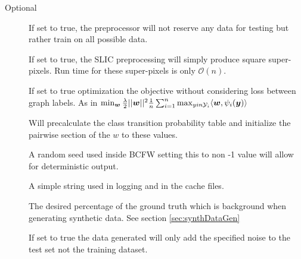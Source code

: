Optional
\begin{description}
\item[] If set to true, the preprocessor will not reserve any data for testing but rather train on all possible data. 
\item[] If set to true, the SLIC preprocessing will simply produce square super-pixels. Run time for these super-pixels is only $\mathcal{O}(n)$. 
\item[]If set to true optimization the objective without considering loss between graph labels. As in $\min_{\bm{w}} \frac{\lambda}{2} ||\bm{w}||^2 \frac{1}{n} \sum_{i=1}^n \max_{y in \mathcal{Y}_i} \langle \bm{w} , \psi_i(\bm{y}) \rangle$
\item[] Will precalculate the class transition probability table and initialize the pairwise section of the $w$ to these values. 
\item[] A random seed used inside BCFW setting this to non -1 value will allow for deterministic output. 
\item[] A simple string used in logging and in the cache files.
\item[] 
\item[] The desired percentage of the ground truth which is background when generating synthetic data. See section \ref{sec:synthDataGen}
\item[] If set to true the data generated will only add the specified noise to the test set not the training dataset. 



\end{description}
